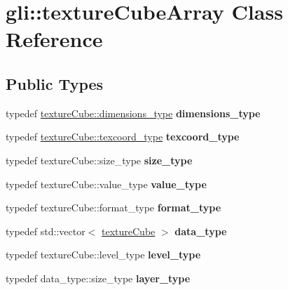 \hypertarget{classgli_1_1textureCubeArray}{\section{gli\-:\-:texture\-Cube\-Array \-Class \-Reference}
\label{classgli_1_1textureCubeArray}
}
\subsection*{\-Public \-Types}
\begin{DoxyCompactItemize}
\item 
\hypertarget{classgli_1_1textureCubeArray_acf8997c33114312ec521ddde492311ac}{typedef \*
\hyperlink{structglm_1_1detail_1_1tvec2}{texture\-Cube\-::dimensions\-\_\-type} {\bfseries dimensions\-\_\-type}}\label{classgli_1_1textureCubeArray_acf8997c33114312ec521ddde492311ac}

\item 
\hypertarget{classgli_1_1textureCubeArray_ae9ae2ae71af8d510abeb6509d5c325a8}{typedef \hyperlink{structglm_1_1detail_1_1tvec2}{texture\-Cube\-::texcoord\-\_\-type} {\bfseries texcoord\-\_\-type}}\label{classgli_1_1textureCubeArray_ae9ae2ae71af8d510abeb6509d5c325a8}

\item 
\hypertarget{classgli_1_1textureCubeArray_ac47db61a53e56015e1b9e1d13fddb198}{typedef texture\-Cube\-::size\-\_\-type {\bfseries size\-\_\-type}}\label{classgli_1_1textureCubeArray_ac47db61a53e56015e1b9e1d13fddb198}

\item 
\hypertarget{classgli_1_1textureCubeArray_adfbeeefcedc30f300afad4e62bc1f789}{typedef texture\-Cube\-::value\-\_\-type {\bfseries value\-\_\-type}}\label{classgli_1_1textureCubeArray_adfbeeefcedc30f300afad4e62bc1f789}

\item 
\hypertarget{classgli_1_1textureCubeArray_ad9dd2c13c344f7e3dd86ad51b5e28c5d}{typedef texture\-Cube\-::format\-\_\-type {\bfseries format\-\_\-type}}\label{classgli_1_1textureCubeArray_ad9dd2c13c344f7e3dd86ad51b5e28c5d}

\item 
\hypertarget{classgli_1_1textureCubeArray_ace00f1f8bee6b0fb6a5499edebbb0067}{typedef std\-::vector$<$ \hyperlink{classgli_1_1textureCube}{texture\-Cube} $>$ {\bfseries data\-\_\-type}}\label{classgli_1_1textureCubeArray_ace00f1f8bee6b0fb6a5499edebbb0067}

\item 
\hypertarget{classgli_1_1textureCubeArray_a04e57a72a34ee12a50c91337804f9ba9}{typedef texture\-Cube\-::level\-\_\-type {\bfseries level\-\_\-type}}\label{classgli_1_1textureCubeArray_a04e57a72a34ee12a50c91337804f9ba9}

\item 
\hypertarget{classgli_1_1textureCubeArray_a44ee348f7c677deeadf3f3ba597491fb}{typedef data\-\_\-type\-::size\-\_\-type {\bfseries layer\-\_\-type}}\label{classgli_1_1textureCubeArray_a44ee348f7c677deeadf3f3ba597491fb}

\end{DoxyCompactItemize}
